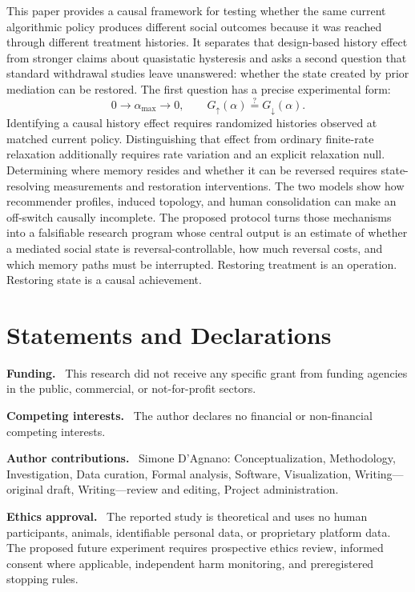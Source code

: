 \documentclass[pdflatex,sn-mathphys-num]{sn-jnl}
\newcommand{\alphamax}{\alpha_{\max}}
\newcommand{\Gup}{G_{\uparrow}}
\newcommand{\Gdown}{G_{\downarrow}}
\newcommand{\inlinehead}[1]{\par\smallskip\noindent\textbf{#1}\ }
\begin{document}
This paper provides a causal framework for testing whether the same current algorithmic policy produces different social outcomes because it was reached through different treatment histories. It separates that design-based history effect from stronger claims about quasistatic hysteresis and asks a second question that standard withdrawal studies leave unanswered: whether the state created by prior mediation can be restored. The first question has a precise experimental form:
\begin{equation}
0\rightarrow\alphamax\rightarrow0,
\qquad
\Gup(\alpha)\stackrel{?}{=}\Gdown(\alpha).
\end{equation}
Identifying a causal history effect requires randomized histories observed at matched current policy. Distinguishing that effect from ordinary finite-rate relaxation additionally requires rate variation and an explicit relaxation null. Determining where memory resides and whether it can be reversed requires state-resolving measurements and restoration interventions. The two models show how recommender profiles, induced topology, and human consolidation can make an off-switch causally incomplete. The proposed protocol turns those mechanisms into a falsifiable research program whose central output is an estimate of whether a mediated social state is reversal-controllable, how much reversal costs, and which memory paths must be interrupted. Restoring treatment is an operation. Restoring state is a causal achievement.

\section*{Statements and Declarations}

\inlinehead{Funding.} This research did not receive any specific grant from funding agencies in the public, commercial, or not-for-profit sectors.

\inlinehead{Competing interests.} The author declares no financial or non-financial competing interests.

\inlinehead{Author contributions.} Simone D'Agnano: Conceptualization, Methodology, Investigation, Data curation, Formal analysis, Software, Visualization, Writing---original draft, Writing---review and editing, Project administration.

\inlinehead{Ethics approval.} The reported study is theoretical and uses no human participants, animals, identifiable personal data, or proprietary platform data. The proposed future experiment requires prospective ethics review, informed consent where applicable, independent harm monitoring, and preregistered stopping rules.
\end{document}
